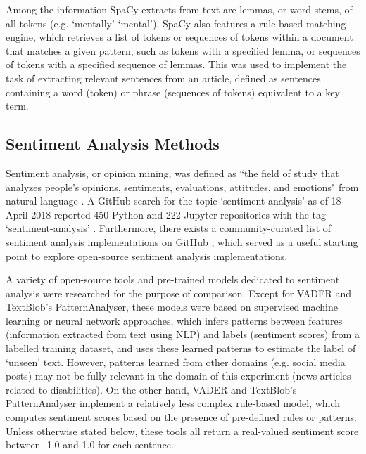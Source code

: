 \documentclass{report}
\begin{document}
Among the information SpaCy extracts from text are lemmas, or word stems, of all tokens (e.g. `mentally' \textrightarrow\space `mental').
SpaCy also features a rule-based matching engine, which retrieves a list of tokens or sequences of tokens within a document that matches a given pattern, such as tokens with a specified lemma, or sequences of tokens with a specified sequence of lemmas.
This was used to implement the task of extracting relevant sentences from an article, defined as sentences containing a word (token) or phrase (sequences of tokens) equivalent to a key term.

\subsection{Sentiment Analysis Methods} \label{tc-sentiment}
Sentiment analysis, or opinion mining, was defined as ``the field of study that analyzes people's opinions, sentiments, evaluations, attitudes, and emotions" from natural language \cite{liu2012sentiment}.
A GitHub search for the topic `sentiment-analysis' as of 18 April 2018 reported 450 Python and 222 Jupyter repositories with the tag `sentiment-analysis' \cite{GitHub-sentiment-analysis}.
Furthermore, there exists a community-curated list of sentiment analysis implementations on GitHub \cite{awesome-sentiment-analysis}, which served as a useful starting point to explore open-source sentiment analysis implementations.

A variety of open-source tools and pre-trained models dedicated to sentiment analysis were researched for the purpose of comparison.
Except for VADER and TextBlob's PatternAnalyser, these models were based on supervised machine learning or neural network approaches, which infers patterns between features (information extracted from text using NLP) and labels (sentiment scores) from a labelled training dataset, and uses these learned patterns to estimate the label of `unseen' text.
However, patterns learned from other domains (e.g. social media posts) may not be fully relevant in the domain of this experiment (news articles related to disabilities).
On the other hand, VADER and TextBlob's PatternAnalyser implement a relatively less complex rule-based model, which computes sentiment scores based on the presence of pre-defined rules or patterns.
Unless otherwise stated below, these tools all return a real-valued sentiment score between -1.0 and 1.0 for each sentence.
\end{document}
